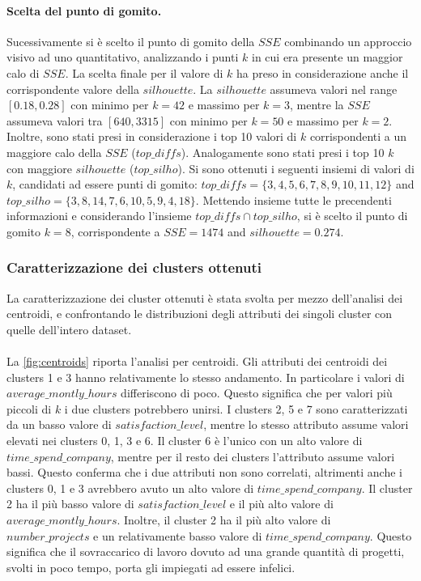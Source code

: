 \documentclass[a4paper]{article}
\begin{document}
\paragraph{Scelta del punto di gomito.}
Sucessivamente si è scelto il punto di gomito della $SSE$ combinando un approccio visivo ad uno quantitativo, analizzando i punti $k$ in cui era presente un maggior calo di $SSE$. La scelta finale per il valore di $k$ ha preso in considerazione anche il corrispondente valore della $silhouette$. La $silhouette$ assumeva valori nel range $\left[0.18, 0.28\right]$ con minimo per $k=42$ e massimo per $k=3$, mentre la $SSE$ assumeva valori tra $\left[640, 3315\right]$ con minimo per $k=50$ e massimo per $k=2$. Inoltre, sono stati presi in considerazione i top 10 valori di $k$ corrispondenti a un maggiore calo della $SSE$ ($top\_diffs$). Analogamente sono stati presi i top 10 $k$ con maggiore $silhouette$ ($top\_silho$). Si sono ottenuti i seguenti insiemi di valori di $k$, candidati ad essere punti di gomito: $top\_diffs=\lbrace3,4,5,6,7,8,9,10,11,12\rbrace$ and $top\_silho=\lbrace3,8,14,7,6,10,5,9,4,18\rbrace$. Mettendo insieme tutte le precendenti informazioni e considerando l'insieme $top\_diffs \cap top\_silho$, si è scelto il punto di gomito $k=8$, corrispondente a $SSE=1474$ and $silhouette=0.274$.

\subsubsection{Caratterizzazione dei clusters ottenuti}
La caratterizzazione dei cluster ottenuti è stata svolta per mezzo dell'analisi dei centroidi, e confrontando le distribuzioni degli attributi dei singoli cluster con quelle dell'intero dataset.
\paragraph{}
La \autoref{fig:centroids} riporta l'analisi per centroidi. Gli attributi dei centroidi dei clusters 1 e 3 hanno relativamente lo stesso andamento. In particolare i valori di $average\_montly\_hours$ differiscono di poco. Questo significa che per valori più piccoli di $k$ i due clusters potrebbero unirsi. I clusters 2, 5 e 7 sono caratterizzati da un basso valore di $satisfaction\_level$, mentre lo stesso attributo assume valori elevati nei clusters 0, 1, 3 e 6. Il cluster 6 è l'unico con un alto valore di $time\_spend\_company$, mentre per il resto dei clusters l'attributo assume valori bassi. Questo conferma che i due attributi non sono correlati, altrimenti anche i clusters 0, 1 e 3 avrebbero avuto un alto valore di $time\_spend\_company$. Il cluster 2 ha il più basso valore di $satisfaction\_level$ e il più alto valore di  $average\_montly\_hours$. Inoltre, il cluster 2 ha il più alto valore di $number\_projects$ e un relativamente basso valore di $time\_spend\_company$. Questo significa che il sovraccarico di lavoro dovuto ad una grande quantità di progetti, svolti in poco tempo, porta gli impiegati ad essere infelici.
\end{document}
